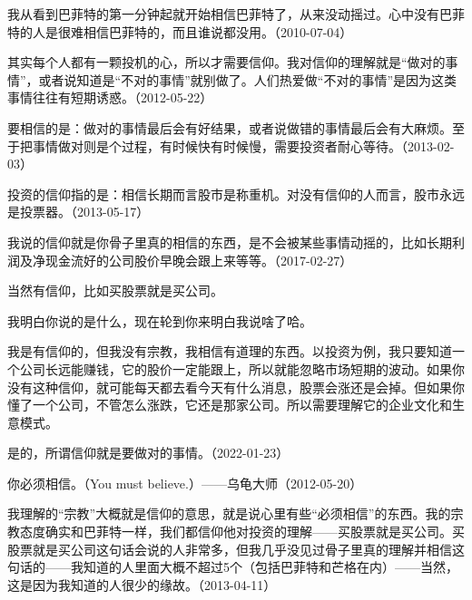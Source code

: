 我从看到巴菲特的第一分钟起就开始相信巴菲特了，从来没动摇过。心中没有巴菲特的人是很难相信巴菲特的，而且谁说都没用。（2010-07-04）

其实每个人都有一颗投机的心，所以才需要信仰。我对信仰的理解就是“做对的事情”，或者说知道是“不对的事情”就别做了。人们热爱做“不对的事情”是因为这类事情往往有短期诱惑。（2012-05-22）

要相信的是：做对的事情最后会有好结果，或者说做错的事情最后会有大麻烦。至于把事情做对则是个过程，有时候快有时候慢，需要投资者耐心等待。（2013-02-03）

投资的信仰指的是：相信长期而言股市是称重机。对没有信仰的人而言，股市永远是投票器。（2013-05-17）

我说的信仰就是你骨子里真的相信的东西，是不会被某些事情动摇的，比如长期利润及净现金流好的公司股价早晚会跟上来等等。（2017-02-27）


当然有信仰，比如买股票就是买公司。


我明白你说的是什么，现在轮到你来明白我说啥了哈。


我是有信仰的，但我没有宗教，我相信有道理的东西。以投资为例，我只要知道一个公司长远能赚钱，它的股价一定能跟上，所以就能忽略市场短期的波动。如果你没有这种信仰，就可能每天都去看今天有什么消息，股票会涨还是会掉。但如果你懂了一个公司，不管怎么涨跌，它还是那家公司。所以需要理解它的企业文化和生意模式。


是的，所谓信仰就是要做对的事情。（2022-01-23）


你必须相信。（You must believe.）——乌龟大师（2012-05-20）


我理解的“宗教”大概就是信仰的意思，就是说心里有些“必须相信”的东西。我的宗教态度确实和巴菲特一样，我们都信仰他对投资的理解——买股票就是买公司。买股票就是买公司这句话会说的人非常多，但我几乎没见过骨子里真的理解并相信这句话的——我知道的人里面大概不超过5个（包括巴菲特和芒格在内）——当然，这是因为我知道的人很少的缘故。（2013-04-11）

